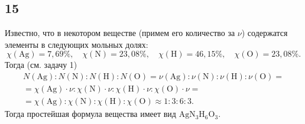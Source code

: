 \subsection{15}

Известно, что в некотором веществе (примем его количество за $\nu$) содержатся элементы в следующих мольных долях:
\[
\chi(\mathrm{Ag})=7{,}69\%,\quad\chi(\mathrm{N})=23{,}08\%,\quad\chi(\mathrm{H})=46{,}15\%,\quad\chi(\mathrm{O})=23{,}08\%.
\]
Тогда (см. задачу 1)
\begin{multline*}
N(\mathrm{Ag}):N(\mathrm{N}):N(\mathrm{H}):N(\mathrm{O})=\nu(\mathrm{Ag}):\nu(\mathrm{N}):\nu(\mathrm{H}):\nu(\mathrm{O})= \\
=\chi(\mathrm{Ag})\cdot\nu:\chi(\mathrm{N})\cdot\nu:\chi(\mathrm{H})\cdot\nu:\chi(\mathrm{O})\cdot\nu= \\
=\chi(\mathrm{Ag}):\chi(\mathrm{N}):\chi(\mathrm{H}):\chi(\mathrm{O})\approx1:3:6:3.
\end{multline*}
Тогда простейшая формула вещества имеет вид $\mathrm{AgN_3H_6O_3}$.